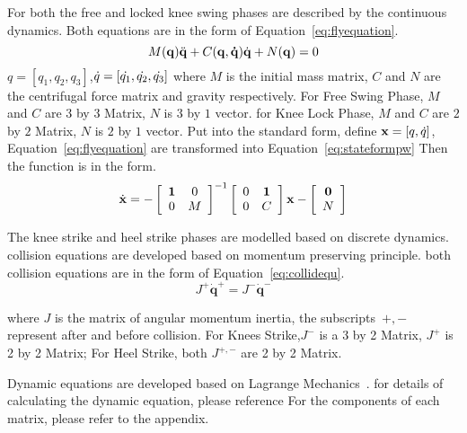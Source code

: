 \begin{itemize}
For both the free and locked knee swing phases are described by the continuous dynamics.
Both equations are in the form of Equation~\ref{eq:flyequation}.
\begin{equation}
\label{eq:flyequation}
M(\mathbf{q}) \ddot{\mathbf{q}} + C(\mathbf{q,\dot{q}})\dot{\mathbf{q}} + N(\mathbf{q}) = 0
\end{equation}
$q=[q_1,q_2,q_3]$,$\dot{q}=[\dot{q_1},\dot{q_2},\dot{q_3}]$
where $M$ is the initial mass matrix, $C$ and $N$ are the centrifugal force matrix and gravity respectively. 
For Free Swing Phase,  $M$ and $C$ are $3$ by $3$ Matrix, $N$ is $3$ by $1$ vector.
for Knee Lock Phase, $M$ and $C$ are $2$ by $2$ Matrix, $N$ is $2$ by $1$ vector.
Put into the standard form, define $\mathbf{x}=[q,\dot{q}]$, Equation~\ref{eq:flyequation} are transformed into Equation~\ref{eq:stateformpw}
Then the function is in the form.
\begin{equation}
\label{eq:stateformpw}
\dot{\mathbf{x}}=
-\left[ 
\begin{array}{cc}
\mathbf{1} &0\\
0 &M 
\end{array}
\right]^{-1}
\left[ 
\begin{array}{cc}
0 &\mathbf{1}\\
0 &C 
\end{array}
\right]\mathbf{x}
-\left[ 
\begin{array}{c}
\mathbf{0}\\
 N 
\end{array}
\right]
\end{equation}

The knee strike and heel strike phases are modelled based on discrete dynamics.
collision equations are developed based on momentum preserving principle.
both collision equations are in the form of Equation~\ref{eq:collidequ}.
\begin{equation}
\label{eq:collidequ}
J^{+}\dot{\mathbf{q}}^{+} = J^{-}\dot{\mathbf{q}}^{-}
\end{equation}

where $J$ is the matrix of angular momentum inertia, the subscripts~$+,-$ represent after and before collision.
For Knees Strike,$J^-$ is a 3 by 2 Matrix, $J^+$ is 2 by 2 Matrix;
For Heel Strike, both $J^{+,-}$ are 2 by 2 Matrix.
\end{itemize}
Dynamic equations are developed based on Lagrange Mechanics~\citep{Goldstein2002}.
for details of calculating the dynamic equation, please reference\citep{Chen2007}
For the components of each matrix, please refer to the appendix.









